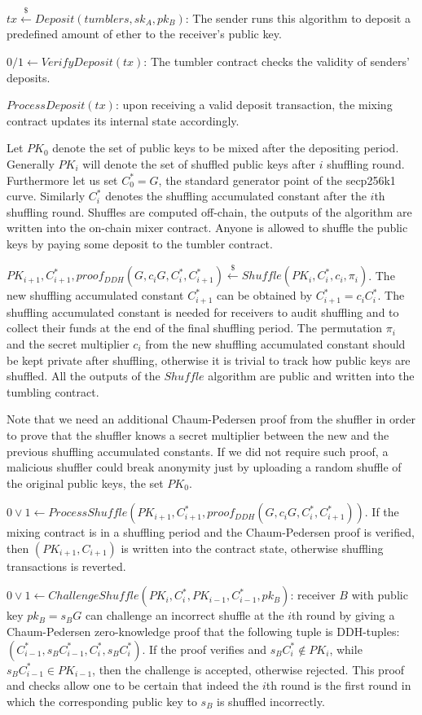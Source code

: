 \documentclass[a4paper,UKenglish,cleveref, autoref]{oasics-v2019}
\begin{document}
$tx\stackrel{\$}{\leftarrow}Deposit(tumblers,sk_A,pk_B)$: The sender runs this algorithm to deposit a predefined amount of ether to the receiver's public key.

$0/1\leftarrow VerifyDeposit(tx)$: The tumbler contract checks the validity of senders' deposits.

$ProcessDeposit(tx)$: upon receiving a valid deposit transaction, the mixing contract updates its internal state accordingly.

Let $PK_{0}$ denote the set of public keys to be mixed after the depositing period. Generally $PK_{i}$ will denote the set of shuffled public keys after $i$ shuffling round. Furthermore let us set $C^{*}_{0}=G$, the standard generator point of the secp256k1 curve. Similarly $C^{*}_{i}$ denotes the shuffling accumulated constant after the $i$th shuffling round. Shuffles are computed off-chain, the outputs of the algorithm are written into the on-chain mixer contract. Anyone is allowed to shuffle the public keys by paying some deposit to the tumbler contract.

$PK_{i+1},C_{i+1}^{*},proof_{DDH}(G,c_{i}G,C^{*}_{i},C^{*}_{i+1})\stackrel{\$}{\leftarrow}Shuffle(PK_{i},C^{*}_{i},c_{i},\pi_{i})$. The new shuffling accumulated constant $C^{*}_{i+1}$ can be obtained by $C^{*}_{i+1}=c_{i}C^{*}_{i}$. The shuffling accumulated constant is needed for receivers to audit shuffling and to collect their funds at the end of the final shuffling period. The permutation $\pi_{i}$ and the secret multiplier $c_{i}$ from the new shuffling accumulated constant should be kept private after shuffling, otherwise it is trivial to track how public keys are shuffled. All the outputs of the $Shuffle$ algorithm are public and written into the tumbling contract.

Note that we need an additional Chaum-Pedersen proof from the shuffler in order to prove that the shuffler knows a secret multiplier between the new and the previous shuffling accumulated constants. If we did not require such proof, a malicious shuffler could break anonymity just by uploading a random shuffle of the original public keys, the set $PK_{0}$.

$0\lor1\leftarrow ProcessShuffle(PK_{i+1},C_{i+1}^{*},proof_{DDH}(G,c_{i}G,C^{*}_{i},C^{*}_{i+1}))$. If the mixing contract is in a shuffling period and the Chaum-Pedersen proof is verified, then $(PK_{i+1},C_{i+1})$ is written into the contract state, otherwise shuffling transactions is reverted.  

$0\lor1\leftarrow 
ChallengeShuffle(PK_{i},C^{*}_{i},PK_{i-1},C^{*}_{i-1},pk_{B})$: receiver $B$ with public key $pk_{B}=s_{B}G$ can challenge an incorrect shuffle at the $i$th round by giving a Chaum-Pedersen zero-knowledge proof that the following tuple is DDH-tuples: $(C^{*}_{i-1}, s_{B}C^{*}_{i-1}, C^{*}_{i}, s_{B}C^{*}_{i})$. If the proof verifies and $s_{B}C^{*}_{i} \notin PK_{i}$, while $s_{B}C^{*}_{i-1} \in PK_{i-1}$, then the challenge is accepted, otherwise rejected. This proof and checks allow one to be certain that indeed the $i$th round is the first round in which the corresponding public key to $s_{B}$ is shuffled incorrectly.  
\end{document}
